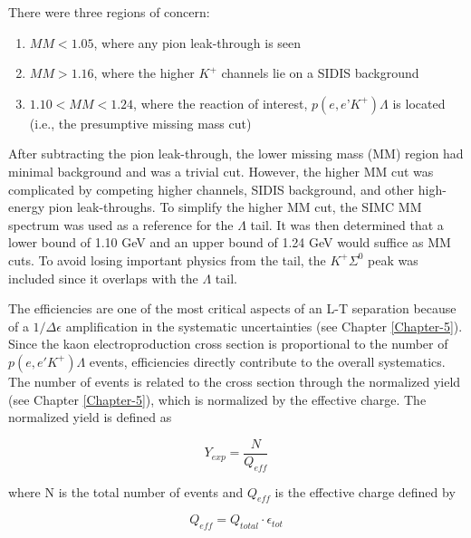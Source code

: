 \documentclass[
]{report}
\begin{document}


There were three regions of concern:

\begin{enumerate}
\item $MM < 1.05$, where any pion leak-through is seen
\item $MM > 1.16$, where the higher $K^+$ channels lie on a SIDIS background
\item $1.10 < MM < 1.24$, where the reaction of interest, $p(e,e’K^+)\Lambda$ is located (i.e., the presumptive missing mass cut)
\end{enumerate}



After subtracting the pion leak-through, the lower missing mass (MM)
region had minimal background and was a trivial cut. However, the higher
MM cut was complicated by competing higher channels, SIDIS background,
and other high-energy pion leak-throughs. To simplify the higher MM cut,
the SIMC MM spectrum was used as a reference for the \(\Lambda\) tail.
It was then determined that a lower bound of 1.10 GeV and an upper bound
of 1.24 GeV would suffice as MM cuts. To avoid losing important physics
from the tail, the \(K^+\Sigma^0\) peak was included since it overlaps
with the \(\Lambda\) tail.

\label{Chapter-3-4}

The efficiencies are one of the most critical aspects of an L-T
separation because of a \(1/\Delta\epsilon\) amplification in the
systematic uncertainties (see Chapter \ref{Chapter-5}). Since the kaon
electroproduction cross section is proportional to the number of
\(p(e, e' K^+)\Lambda\) events, efficiencies directly contribute to the
overall systematics. The number of events is related to the cross
section through the normalized yield (see Chapter \ref{Chapter-5}),
which is normalized by the effective charge. The normalized yield is
defined as

\begin{equation} 
  Y_{exp}=\frac{N}{Q_{eff}}
  \label{eq:norm_yield} 
\end{equation}

\noindent where N is the total number of events and \(Q_{eff}\) is the
effective charge defined by

\begin{equation} 
  Q_{eff}=Q_{total}\cdot\epsilon_{tot}
  \label{eq:eff_charge} 
\end{equation}
\end{document}
